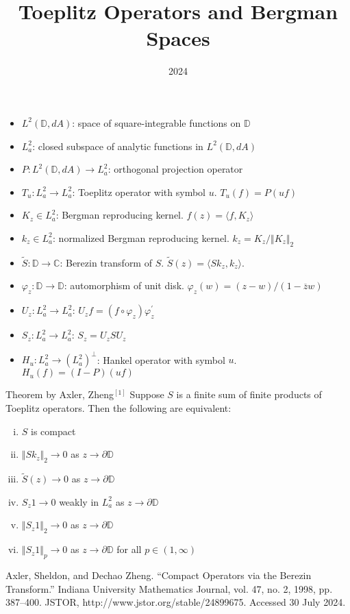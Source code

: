 \documentclass{beamer}
\title{Toeplitz Operators and Bergman Spaces}
\author{}
\institute{Polymath Jr}
\date{2024}
\begin{document}
\frame{\titlepage}


\begin{frame}

\begin{itemize}
\item $L^2(\mathbb{D}, dA)$: space of square-integrable functions on $\mathbb{D}$
\item $L_a^2$: closed subspace of analytic functions in $L^2(\mathbb{D}, dA)$
\item $P: L^2(\mathbb{D},dA) \rightarrow L_a^2$: orthogonal projection operator
\item $T_u: L_a^2 \rightarrow L_a^2$: Toeplitz operator with symbol $u$. $T_u(f) = P(u f)$
\item $K_z \in L_a^2$: Bergman reproducing kernel. $f(z) = \langle f, K_z \rangle$ 
\item $k_z \in L_a^2$: normalized Bergman reproducing kernel. $k_z = K_z/\Vert K_z \Vert_2$
\item $\tilde{S}: \mathbb{D} \rightarrow \mathbb{C}$: Berezin transform of $S$. $\tilde{S}(z) = \langle Sk_z, k_z \rangle$.
\item $\varphi_z: \mathbb{D} \rightarrow \mathbb{D}$: automorphism of unit disk. $\varphi_z(w) = (z - w)/(1-\overline{z}w)$
\item $U_z: L_a^2 \rightarrow L_a^2$: $U_z f = (f\circ \varphi_z)\varphi_z^\prime$
\item $S_z: L_a^2 \rightarrow L_a^2$: $S_z = U_zSU_z$
\item $H_u: L_a^2 \rightarrow (L_a^2)^\perp$: Hankel operator with symbol $u$. $H_u(f) = (I-P)(uf)$
\end{itemize}
\end{frame}

\begin{frame}
\begin{block}{Theorem by Axler, Zheng$^{[1]}$}
Suppose $S$ is a finite sum of finite products of Toeplitz operators. Then the following are equivalent:
\begin{enumerate}[(i)]
            \item $S$ is compact
            \item $\Vert Sk_z \Vert_2 \rightarrow 0$ as $z \rightarrow \partial{\mathbb{D}}$
            \item $\tilde{S}(z) \rightarrow 0$ as $z \rightarrow \partial{\mathbb{D}}$
            \item $S_z 1 \rightarrow 0$ weakly in $L_a^2$ as $z \rightarrow \partial{\mathbb{D}}$
            \item $\Vert S_z 1 \Vert_2 \rightarrow 0$ as $z \rightarrow \partial{\mathbb{D}}$
            \item $\Vert S_z 1\Vert_p \rightarrow 0$ as $z \rightarrow \partial{\mathbb{D}}$ for all $p \in (1,\infty)$
        \end{enumerate}
        
\end{block}
	\tiny{Axler, Sheldon, and Dechao Zheng. “Compact Operators via the Berezin Transform.” Indiana University Mathematics Journal, vol. 47, no. 2, 1998, pp. 387–400. JSTOR, http://www.jstor.org/stable/24899675. Accessed 30 July 2024.}
\end{frame}
\end{document}
